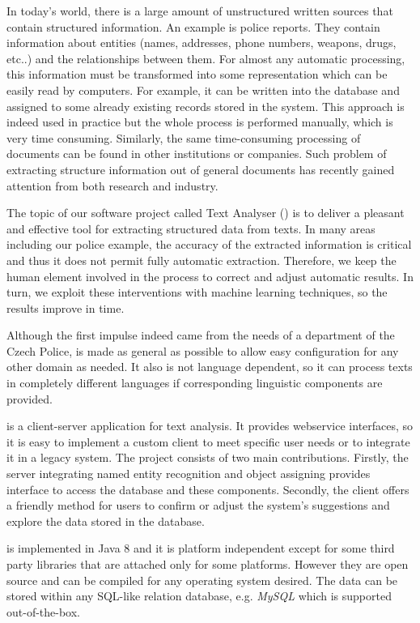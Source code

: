 
In today's world, there is a large amount of unstructured written sources that
contain structured information. An example is police reports. They contain
information about entities (names, addresses, phone numbers, weapons, drugs,
etc..) and the relationships between them. For almost any automatic processing,
this information must be transformed into some representation which can be
easily read by computers. For example, it can be written into the database and
assigned to some already existing records stored in the system. This approach is
indeed used in practice but the whole process is performed manually, which is
very time consuming. Similarly, the same time-consuming processing of documents
can be found in other institutions or companies. Such problem of extracting
structure information out of general documents has recently gained attention
from both research and industry. 

The topic of our software project called Text Analyser (\textan{}) is to
deliver a pleasant and effective tool for extracting structured data from texts.
In many areas including our police example, the accuracy of the extracted
information is critical and thus it does not permit fully automatic extraction.
Therefore, we keep the human element involved in the process to correct and
adjust automatic results. In turn, we exploit these interventions with machine
learning techniques, so the results improve in time.

Although the first impulse indeed came from the needs of a department of the
Czech Police, \textan{} is made as general as possible to allow easy 
configuration for any other domain as needed. It also is not language dependent,
so it can process texts in completely different languages if corresponding
linguistic components are provided.

\textan{} is a client-server application for text analysis. It provides
webservice interfaces, so it is easy to implement a custom client to meet
specific user needs or to integrate it in a legacy system. The project
consists of two main contributions. Firstly, the server integrating named entity
recognition and object assigning provides interface to access the database and
these components. Secondly, the client offers a friendly method for users to
confirm or adjust the system's suggestions and explore the data stored in the
database.

\textan{} is implemented in Java 8 and it is platform independent except for
some third party libraries that are attached only for some platforms. However
they are open source and can be compiled for any operating system desired. The
data can be stored within any SQL-like relation database, e.g. \emph{MySQL} which
is supported out-of-the-box.
